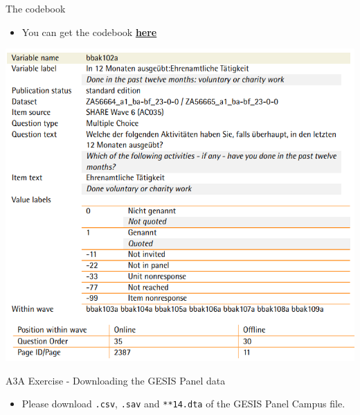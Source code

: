 \documentclass[ignorenonframetext,]{beamer}
\providecommand{\tightlist}{%
  \setlength{\itemsep}{0pt}\setlength{\parskip}{0pt}}
\begin{document}
\begin{frame}{The codebook}

\begin{itemize}
\tightlist
\item
  You can get the codebook
  \href{https://www.gesis.org/gesis-panel/documentation/}{\textbf{here}}
\end{itemize}

\includegraphics{figure/cdb_bbak102a.PNG}

\end{frame}

\begin{frame}[fragile]{A3A Exercise - Downloading the GESIS Panel data}

\begin{itemize}
\tightlist
\item
  Please download \texttt{.csv}, \texttt{.sav} and \texttt{**14.dta} of
  the GESIS Panel Campus file.
\end{itemize}

\end{frame}
\end{document}

